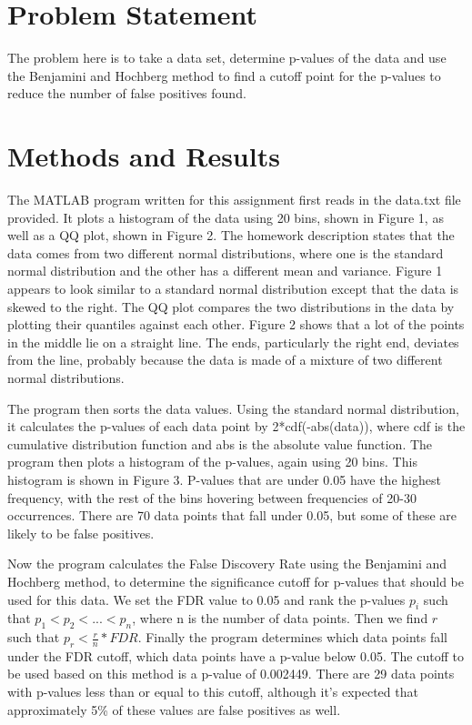 \documentclass{acm_proc_article-sp}
\begin{document}
\section{Problem Statement}
The problem here is to take a data set, determine p-values of the data and use the Benjamini and Hochberg method to find a cutoff point for the p-values to reduce the number of false positives found.  

\section{Methods and Results}
The MATLAB program written for this assignment first reads in the data.txt file provided.  It plots a histogram of the data using 20 bins, shown in Figure 1, as well as a QQ plot, shown in Figure 2.  The homework description states that the data comes from two different normal distributions, where one is the standard normal distribution and the other has a different mean and variance.  Figure 1 appears to look similar to a standard normal distribution except that the data is skewed to the right.  The QQ plot compares the two distributions in the data by plotting their quantiles against each other.  Figure 2 shows that a lot of the points in the middle lie on a straight line.  The ends, particularly the right end, deviates from the line, probably because the data is made of a mixture of two different normal distributions.

The program then sorts the data values.  Using the standard normal distribution, it calculates the p-values of each data point by 2*cdf(-abs(data)), where cdf is the cumulative distribution function and abs is the absolute value function.  The program then plots a histogram of the p-values, again using 20 bins.  This histogram is shown in Figure 3.  P-values that are under 0.05 have the highest frequency, with the rest of the bins hovering between frequencies of 20-30 occurrences.  There are 70 data points that fall under 0.05, but some of these are likely to be false positives.    

Now the program calculates the False Discovery Rate using the Benjamini and Hochberg method, to determine the significance cutoff for p-values that should be used for this data.  We set the FDR value to 0.05 and rank the p-values $p_i$ such that $p_1 < p_2 < ... < p_n$, where n is the number of data points.  Then we find $r$ such that $p_r < \frac{r}{n}*FDR$.  Finally the program determines which data points fall under the FDR cutoff, which data points have a p-value below 0.05.  The cutoff to be used based on this method is a p-value of 0.002449.  There are 29 data points with p-values less than or equal to this cutoff, although it's expected that approximately 5\% of these values are false positives as well.    
\end{document}
